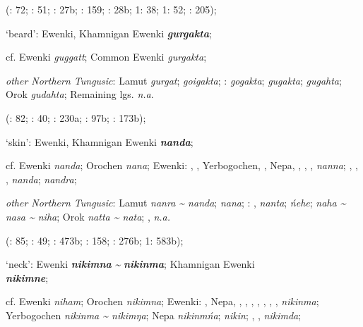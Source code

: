 \documentclass[output=paper,colorlinks,citecolor=brown]{langscibook}
\begin{document}
\begin{xlist}
\begin{xlist}
    (\citealt{Castrén1856}: 72; \citealt{Janhunen1991}: 51; \citealt{Dorji1998}: 27b; \citealt{Chaoke2014a}: 159; \citealt{Vasilevic1958}: 28b; \citealt{Cincius1975B} 1: 38; \citealt{Hauer1952} 1: 52; \citealt{Zikmundová2013a}: 205); 

    \ex ‘beard’:  Ewenki, Khamnigan Ewenki \textbf{\textit{gurgakta}};

    cf.  Ewenki \textit{guggatt};  Common Ewenki \textit{gurgakta};

    \textit{other Northern Tungusic}: Lamut \textit{gurgat};  \textit{goigakta}; \textit{}:  \textit{gogakta};  \textit{gugakta};  \textit{gugahta}; Orok \textit{gudahta}; Remaining lgs. \textit{n.a}.
    
    (\citealt{Castrén1856}: 82; \citealt{Janhunen1991}: 40; \citealt{Dorji1998}: 230a; \citealt{Vasilevic1958}: 97b; \citealt{Cincius1975B}: 173b);

    \ex ‘skin’:  Ewenki, Khamnigan Ewenki \textbf{\textit{nanda}};

    cf.  Ewenki \textit{nanda}; Orochen \textit{nana};  Ewenki: , , Yerbogochen, , Nepa, , , ,  \textit{nanna}; , , ,  \textit{nanda};  \textit{nandra};

    \textit{other Northern Tungusic}: Lamut \textit{nanra {\textasciitilde} nanda};  \textit{nana}; \textit{}: ,  \textit{nanta};  \textit{ńehe};  \textit{naha {\textasciitilde} nasa {\textasciitilde} niha}; Orok \textit{natta {\textasciitilde} nata}; ,  \textit{n.a.} 
    
    (\citealt{Castrén1856}: 85; \citealt{Janhunen1991}: 49; \citealt{Dorji1998}: 473b; \citealt{Chaoke2014a}: 158; \citealt{Vasilevic1958}: 276b; \citealt{Cincius1975B} 1: 583b); 

    \ex ‘neck’:  Ewenki \textbf{\textit{nikimna}} \textit{{\textasciitilde}} \textbf{\textit{nikinma}}; Khamnigan Ewenki\\ \textbf{\textit{nikimne}};

    cf.  Ewenki \textit{niham}; Orochen \textit{nikimna};  Ewenki: , Nepa, , , , , , , ,  \textit{nikinma}; Yerbogochen \textit{nikinma {\textasciitilde} nikimŋa}; Nepa \textit{nikinmńa};  \textit{nikin}; , ,  \textit{nikimda};


\end{xlist}
\end{xlist}
\end{document}
